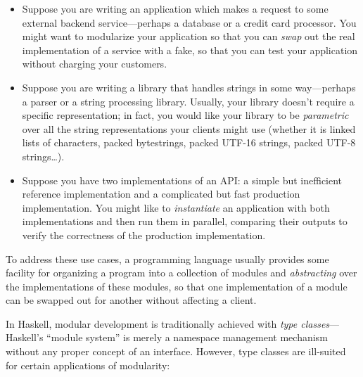 \begin{itemize}
    \item Suppose you are writing an application which makes a request to
    some external backend service---perhaps a database or a credit card
    processor.  You might want to modularize your
    application so that you can \emph{swap} out the real implementation
    of a service with a fake, so that you can test your application without
    charging your customers.

    \item Suppose you are writing a library that handles strings in some
    way---perhaps a parser or a string processing library.  Usually, your
    library doesn't require a specific representation; in fact, you would
    like your library to be \emph{parametric} over all the string representations
    your clients might use (whether it is linked lists of
    characters, packed bytestrings, packed UTF-16 strings, packed UTF-8
    strings\ldots).

    \item Suppose you have two implementations of an API\@: a simple but
    inefficient reference implementation and a complicated but
    fast production implementation.  You might like to \emph{instantiate}
    an application with both implementations and then run them in
    parallel, comparing their outputs to verify the correctness of the
    production implementation.
\end{itemize}
%
To address these use cases, a programming language usually provides some
facility for organizing a program into a collection of modules and
\emph{abstracting} over the implementations of these modules, so that
one implementation of a module can be swapped out for another without
affecting a client.

In Haskell, modular development is traditionally achieved with
\emph{type classes}---Haskell's ``module system'' is merely
a namespace management mechanism without any proper concept of an
interface.  However, type classes are ill-suited for certain
applications of modularity:

